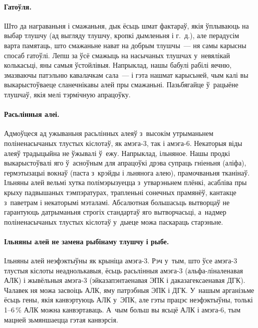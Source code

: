 \paragraph{Гатоўля.}
Што да награваньня і смажаньня, дык ёсьць шмат фактараў, якія ўплываюць на выбар тлушчу (ад выгляду тлушчу, кропкі дымленьня і г.~д.), але перадусім варта памятаць, што смажаньне нават на добрым тлушчы~--- ня самы карысны спосаб гатоўлі. Лепш за ўсё смажыць на насычаных тлушчах у~невялікай колькасьці, яны самыя ўстойлівыя. Напрыклад, нашы бабулі рабілі яечню, змазваючы патэльню кавалачкам сала~--- і гэта нашмат карысьней, чым калі вы выкарыстоўваеце сланечнікавы алей пры смажаньні. Пазьбягайце ў~рацыёне тлушчаў, якія мелі тэрмічную апрацоўку.

\paragraph{Расьлінныя алеі.}
Адмоўцеся ад ужываньня расьлінных алеяў з~высокім утрыманьнем поліненасычаных тлустых кіслотаў, як амэга-3, так і амэга-6. Некаторыя віды алеяў традыцыйна не ўжывалі ў~ежу. Напрыклад, ільняное. Нашы продкі выкарыстоўвалі яго ў~асноўным для апрацоўкі дрэва супраць гніеньня (аліфа), гермэтызацыі вокнаў (паста з~крэйды і льнянога алею), прамочваньня тканінаў. Ільняны алей вельмі хутка полімэрызуецца з~утварэньнем плёнкі, асабліва пры крыху падвышаных тэмпэратурах, трапленьні сонечных прамянёў, кантакце з~паветрам і некаторымі мэталамі. Абсалютная большасьць вытворцаў не гарантуюць датрыманьня строгіх стандартаў яго вытворчасьці, а~надмер поліненасычаных тлустых кіслотаў у~дыеце можа паскараць старэньне.


\paragraph{Ільняны алей не замена рыбінаму тлушчу і рыбе.}
Ільняны алей неэфэктыўны як крыніца амэга-3. Рэч у~тым, што ўсе амэга-3 тлустыя кіслоты неаднолькавыя, ёсьць расьлінныя амэга-3 (альфа-ліналенавая АЛК) і жывёльныя амэга-3 (эйказапэнтаенавая ЭПК і даказагексаенавая ДГК). Чалавек ня можа засвоіць АЛК, яму патрэбныя ЭПК і ДГК. У~нашым арганізьме ёсьць гены, якія канвэртуюць АЛК у~ЭПК, але гэты працэс неэфэктыўны, толькі 1--6\,\% АЛК можна канвэртаваць. А~чым больш вы ясьцё АЛК і амэга-6, тым мацней зьмяншаецца гэтая канвэрсія.

